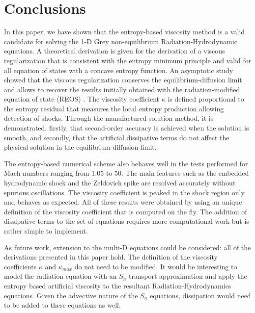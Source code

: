 \documentclass[review]{elsarticle}
\begin{document}
\section{Conclusions}
\label{sec:ccl}

In this paper, we have shown that the entropy-based viscosity method is a valid candidate for solving the 1-D Grey non-equilibrium Radiation-Hydrodynamic equations. A theoretical derivation is given for the derivation of a viscous regularization that is consistent with the entropy minimum principle and valid for all equation of states with a concave entropy function. An asymptotic study showed that the viscous regularization conserves the equilibrium-diffusion limit and allows to recover the results initially obtained with the radiation-modified equation of state (REOS) \cite{LowrieMorel}. The viscosity coefficient $\kappa$ is defined proportional to the entropy residual that measures the local entropy production allowing detection of shocks. Through the manufactured solution method, it is demonstrated, firstly, that second-order accuracy is achieved when the solution is smooth, and secondly, that the artificial dissipative terms do not affect the physical solution in the equilibrium-diffusion limit. 

The entropy-based numerical scheme also behaves well in the tests performed for Mach numbers ranging from $1.05$ to $50$. The main features such as the embedded hydrodynamic shock and the Zeldovich spike are resolved accurately without spurious oscillations. The viscosity coefficient is peaked in the shock region only and behaves as expected. All of these results were obtained by using an unique definition of the viscosity coefficient that is computed on the fly. The addition of dissipative terms to the set of equations requires more computational work but is rather simple to implement.

As future work, extension to the multi-D equations could be considered: all of the derivations presented in this paper hold. The definition of the viscosity coefficients $\kappa$ and $\kappa_{max}$ do not need to be modified. It would be interesting to model the radiation equation with an $S_n$ transport approximation and apply the entropy based artificial viscosity to the resultant Radiation-Hydrodynamics equations. Given the advective nature of the $S_n$ equations, dissipation would need to be added to these equations as well.
\end{document}
